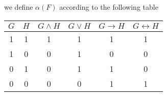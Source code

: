 we define $\alpha (F)$ according to the following table 
\begin{center}
\begin{tabular}{c | c | c | c | c | c }
    $G$ & $H$ & $G\wedge H$ & $G\vee H$ & $G\to H$ & $G\leftrightarrow H$ \\ \hline
    1 & 1   &    1      &     1        &   1      &     1\\
    1 & 0   &    0      &     1       &    0     &      0\\
    0 & 1    &   0      &     1       &    1     &      0\\
    0 & 0    &   0      &     0       &    1    &       1
    
\end{tabular}

\end{center}


